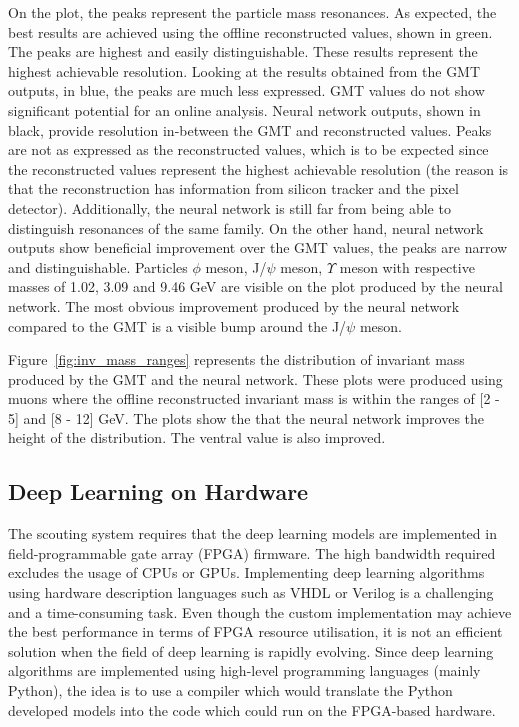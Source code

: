 \documentclass[10pt, paper=a4, UKenglish]{article}
\begin{document}
On the plot, the peaks represent the particle mass resonances. As expected, the best results are achieved using the offline reconstructed values, shown in green. The peaks are highest and easily distinguishable. These results represent the highest achievable resolution. Looking at the results obtained from the GMT outputs, in blue, the peaks are much less expressed. GMT values do not show significant potential for an online analysis. Neural network outputs, shown in black, provide resolution in-between the GMT and reconstructed values. Peaks are not as expressed as the reconstructed values, which is to be expected since the reconstructed values represent the highest achievable resolution (the reason is that the reconstruction has information from silicon tracker and the pixel detector). Additionally, the neural network is still far from being able to distinguish resonances of the same family. On the other hand, neural network outputs show beneficial improvement over the GMT values, the peaks are narrow and distinguishable. Particles $\phi$ meson, J/$\psi$ meson, $\Upsilon$ meson with respective masses of 1.02, 3.09 and 9.46 GeV are visible on the plot produced by the neural network. The most obvious improvement produced by the neural network compared to the GMT is a visible bump around the J/$\psi$ meson.

Figure~\ref{fig:inv_mass_ranges} represents the distribution of invariant mass produced by the GMT and the neural network. These plots were produced using muons where the offline reconstructed invariant mass is within the ranges of [2 - 5] and [8 - 12] GeV. The plots show the that the neural network improves the height of the distribution. The ventral value is also improved.

\subsection{Deep Learning on Hardware}

The scouting system requires that the deep learning models are implemented in field-programmable gate array (FPGA) firmware. The high bandwidth required excludes the usage of CPUs or GPUs. Implementing deep learning algorithms using hardware description languages such as VHDL or Verilog is a challenging and a time-consuming task. Even though the custom implementation may achieve the best performance in terms of FPGA resource utilisation, it is not an efficient solution when the field of deep learning is rapidly evolving. Since deep learning algorithms are implemented using high-level programming languages (mainly Python), the idea is to use a compiler which would translate the Python developed models into the code which could run on the FPGA-based hardware.
\end{document}
